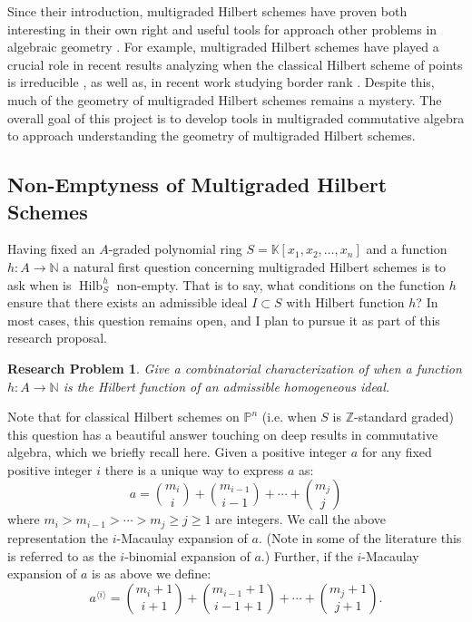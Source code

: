 \documentclass[11pt,reqno]{amsart}
\newtheorem{problem}[lemma]{Research Problem}
\theoremstyle{remark}
\newcommand{\Hilb}{\operatorname{Hilb}}
\newcommand{\K}{\mathbb{K}}
\newcommand{\N}{\mathbb{N}}
\renewcommand{\P}{\mathbb{P}}
\newcommand{\Z}{\mathbb{Z}}
\begin{document}
Since their introduction, multigraded Hilbert schemes have proven both interesting in their own right \cite{santos05,maclaganSmith10,heringMaclagan12,ramkumarSammartano22} and useful tools for approach other problems in algebraic geometry \cite{alexeevBrion04,KLM12,ellenbergErman16,donaldsonSun17}. For example, multigraded Hilbert schemes have played a crucial role in recent results analyzing when the classical Hilbert scheme of points is irreducible \cite{cartwrightErmanVelscoViray09,DJNT17, jelisiejew20}, as well as, in recent work studying border rank \cite{BB21,HJMS22}. Despite this, much of the geometry of multigraded Hilbert schemes remains a mystery. The overall goal of this project is to develop tools in multigraded commutative algebra to approach understanding the geometry of multigraded Hilbert schemes. 



\subsection{Non-Emptyness of Multigraded Hilbert Schemes}

Having fixed an $A$-graded polynomial ring $S=\K[x_{1},x_{2},\ldots,x_{n}]$ and a function $h:A\to\N$ a natural first question concerning multigraded Hilbert schemes is to ask when is $\Hilb_{S}^{h}$ non-empty. That is to say, what conditions on the function $h$ ensure that there exists an admissible ideal $I\subset S$ with Hilbert function $h$? In most cases, this question remains open, and I plan to pursue it as part of this research proposal. 

\begin{problem}\label{prob:mg-hilbert-functions}
Give a combinatorial characterization of when a function $h:A \to \N$ is the Hilbert function of an admissible homogeneous ideal.
\end{problem}


Note that for classical Hilbert schemes on $\P^{n}$ (i.e. when $S$ is $\Z$-standard graded) this question has a beautiful answer touching on deep results in commutative algebra, which we briefly recall here. Given a positive integer $a$ for any fixed positive integer $i$ there is a unique way to express $a$ as:
\[
a = \binom{m_{i}}{i}+\binom{m_{i-1}}{i-1}+\cdots+\binom{m_{j}}{j}
\]
where $m_{i}> m_{i-1}>\cdots >m_{j}\geq j\geq 1$ are integers. We call the above representation the $i$-Macaulay expansion of $a$. (Note in some of the literature this is referred to as the $i$-binomial expansion of $a$.) Further, if the $i$-Macaulay expansion of $a$ is as above we define:
\[
a^{\langle i \rangle} = \binom{m_{i}+1}{i+1}+\binom{m_{i-1}+1}{i-1+1}+\cdots+\binom{m_{j}+1}{j+1}.
\]
\end{document}
